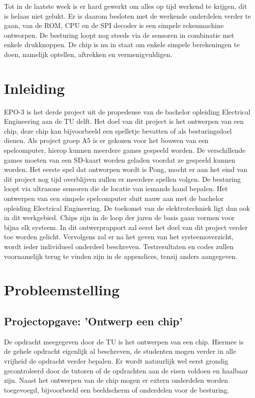 \documentclass[oneside,dutch]{tudelft-report}
\begin{document}
Tot in de laatste week is er hard gewerkt om alles op tijd werkend te krijgen, dit is helaas niet gelukt. Er is daarom besloten met de werkende onderdelen verder te gaan, van de ROM, CPU en de SPI decoder is een simpele rekenmachine ontworpen. De besturing loopt nog steeds via de sensoren in combinatie met enkele drukknoppen. De chip is nu in staat om enkele simpele berekeningen te doen, namelijk optellen, aftrekken en vermenigvuldigen.


\tableofcontents
\mainmatter

\chapter{Inleiding}
EPO-3 is het derde project uit de propedeuse van de bachelor opleiding Electrical Engineering aan de TU delft. Het doel van dit project is het ontwerpen van een chip, deze chip kan bijvoorbeeld een spelletje bevatten of als besturingsdoel dienen. Als project groep A5 is er gekozen voor het bouwen van een spelcomputer, hierop kunnen meerdere games gespeeld worden. De verschillende games moeten van een SD-kaart worden geladen voordat ze gespeeld kunnen worden. Het eerste spel dat ontworpen wordt is Pong, mocht er aan het eind van dit project nog tijd overblijven zullen er meerdere spellen volgen. De besturing loopt via ultrasone sensoren die de locatie van iemands hand bepalen. Het ontwerpen van een simpele spelcomputer sluit nauw aan met de bachelor opleiding Electrical Engineering. De toekomst van de elektrotechniek ligt dan ook in dit werkgebied. Chips zijn in de loop der jaren de basis gaan vormen voor bijna elk systeem. In dit ontwerprapport zal eerst het doel van dit project verder toe worden gelicht. Vervolgens zal er na het geven van het systeemoverzicht, wordt ieder individueel onderdeel beschreven. Testresultaten en codes zullen voornamelijk terug te vinden zijn in de appendices, tenzij anders aangegeven. 

\chapter{Probleemstelling}
\section{Projectopgave: 'Ontwerp een chip'}
De opdracht meegegeven door de TU is het ontwerpen van een chip. Hiermee is de gehele opdracht eigenlijk al beschreven, de studenten mogen verder in alle vrijheid de opdracht verder bepalen. Er wordt natuurlijk wel eerst grondig gecontroleerd door de tutoren of de opdrachten aan de eisen voldoen en haalbaar zijn.  Naast het ontwerpen van de chip mogen er extern onderdelen worden toegevoegd, bijvoorbeeld een beeldscherm of onderdelen voor de besturing. 
\end{document}
